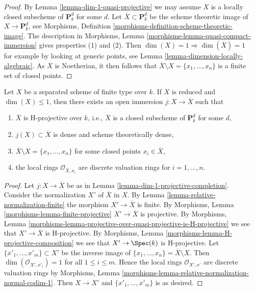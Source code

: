 \begin{proof}
By Lemma \ref{lemma-dim-1-quasi-projective} we may assume $X$ is a
locally closed subscheme of $\mathbf{P}^d_k$ for some $d$. Let
$\overline{X} \subset \mathbf{P}^d_k$ be the scheme theoretic image
of $X \to \mathbf{P}^d_k$, see Morphisms, Definition
\ref{morphisms-definition-scheme-theoretic-image}.
The description in
Morphisms, Lemma \ref{morphisms-lemma-quasi-compact-immersion}
gives properties (1) and (2).
Then $\dim(X) = 1 \Rightarrow \dim(\overline{X}) = 1$ for example by
looking at generic points, see
Lemma \ref{lemma-dimension-locally-algebraic}.
As $\overline{X}$ is Noetherian, it then
follows that $\overline{X} \setminus X = \{x_1, \ldots, x_n\}$
is a finite set of closed points.
\end{proof}

\begin{lemma}
\label{lemma-reduced-dim-1-projective-completion}
Let $X$ be a separated scheme of finite type over $k$.
If $X$ is reduced and $\dim(X) \leq 1$, then there exists
an open immersion $j : X \to \overline{X}$ such that
\begin{enumerate}
\item $\overline{X}$ is H-projective over $k$, i.e., $\overline{X}$
is a closed subscheme of $\mathbf{P}^d_k$ for some $d$,
\item $j(X) \subset \overline{X}$ is dense and scheme
theoretically dense,
\item $\overline{X} \setminus X = \{x_1, \ldots, x_n\}$
for some closed points $x_i \in \overline{X}$,
\item the local rings $\mathcal{O}_{\overline{X}, x_i}$
are discrete valuation rings for $i = 1, \ldots, n$.
\end{enumerate}
\end{lemma}

\begin{proof}
Let $j : X \to \overline{X}$ be as in
Lemma \ref{lemma-dim-1-projective-completion}.
Consider the normalization $X'$ of $\overline{X}$ in
$X$. By Lemma \ref{lemma-relative-normalization-finite}
the morphism $X' \to \overline{X}$ is finite.
By Morphisms, Lemma \ref{morphisms-lemma-finite-projective}
$X' \to \overline{X}$ is projective. By Morphisms, Lemma
\ref{morphisms-lemma-projective-over-quasi-projective-is-H-projective}
we see that $X' \to \overline{X}$ is H-projective.
By Morphisms, Lemma \ref{morphisms-lemma-H-projective-composition}
we see that $X' \to \Spec(k)$ is H-projective.
Let $\{x'_1, \ldots, x'_m\} \subset X'$ be the inverse
image of $\{x_1, \ldots, x_n\} = \overline{X} \setminus X$.
Then $\dim(\mathcal{O}_{X', x'_i}) = 1$ for all $1 \leq i \leq m$.
Hence the local rings $\mathcal{O}_{X', x'}$
are discrete valuation rings by
Morphisms, Lemma
\ref{morphisms-lemma-relative-normalization-normal-codim-1}.
Then $X \to X'$ and $\{x'_1, \ldots, x'_m\}$ is as desired.
\end{proof}

